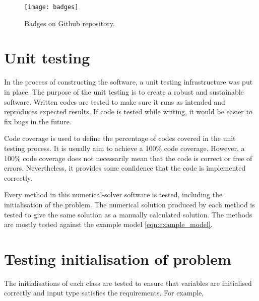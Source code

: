 \begin{figure}
    \texttt{[image: badges]}
    \caption{Badges on Github repository.}
    \label{fig:badges}
 \end{figure}

\section{Unit testing}
\label{sec:testing}
In the process of constructing the software, a unit testing infrastructure was put in place. The purpose of the unit testing is to create a robust and sustainable software. Written codes are tested to make sure it runs as intended and reproduces expected results. If code is tested while writing, it would be easier to fix bugs in the future. 

Code coverage is used to define the percentage of codes covered in the unit testing process. It is usually aim to achieve a 100\% code coverage. However, a 100\% code coverage does not necessarily mean that the code is correct or free of errors. Nevertheless, it provides some confidence that the code is implemented correctly.

Every method in this numerical-solver software is tested, including the initialisation of the problem. The numerical solution produced by each method is tested to give the same solution as a manually calculated solution. The methods are mostly tested against the example model \ref{eqn:example_model}.

\section{Testing initialisation of problem}
\label{sec:test_init}
The initialisations of each class are tested to ensure that variables are initialised correctly and input type satisfies the requirements. For example, 


